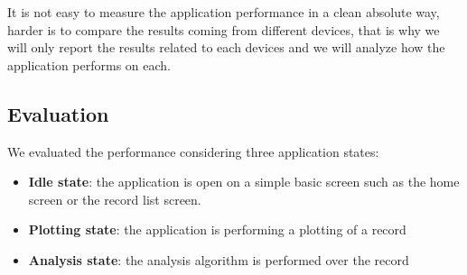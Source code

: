 It is not easy to measure the application performance in a clean absolute way, harder is to compare the results coming from different devices, that is why we will only report the results related to each devices and we will analyze how the application performs on each.
\subsection{Evaluation}
We evaluated the performance considering three application states:
\begin{itemize}
	\item \textbf{Idle state}: the application is open on a simple basic screen such as the home screen or the record list screen.
	\item \textbf{Plotting state}: the application is performing a plotting of a record
	\item \textbf{Analysis state}: the analysis algorithm is performed over the record
\end{itemize}
